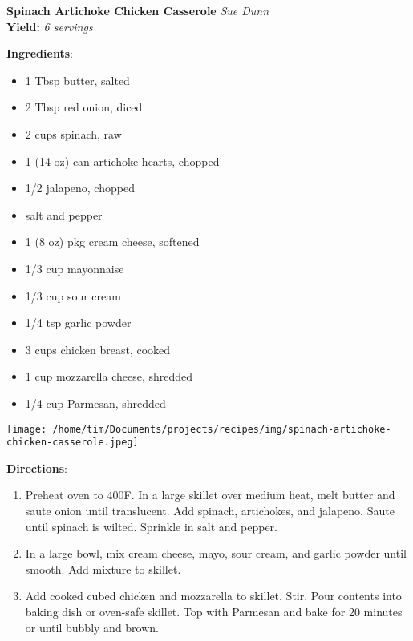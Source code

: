 \documentclass[11pt, twoside, openany]{book}
\begin{document}
\noindent\begin{minipage}[t]{\linewidth}%
{\Large\textbf{Spinach Artichoke Chicken Casserole}} \label{spinach-artichoke-chicken-casserole}\hfill\textit{Sue Dunn}\\
\textbf{Yield:} \textit{6 servings}\\
\noindent\begin{minipage}[t]{0.78\linewidth}%
\textbf{Ingredients}:\vspace{-3mm}
\begin{multicols}{2}
\begin{itemize}\setlength\itemsep{-1mm}
\item 1 Tbsp butter, salted
\item 2 Tbsp red onion, diced
\item 2 cups spinach, raw
\item 1 (14 oz) can artichoke hearts, chopped
\item 1/2 jalapeno, chopped
\item salt and pepper
\item 1 (8 oz) pkg cream cheese, softened
\item 1/3 cup mayonnaise
\item 1/3 cup sour cream
\item 1/4 tsp garlic powder
\item 3 cups chicken breast, cooked
\item 1 cup mozzarella cheese, shredded
\item 1/4 cup Parmesan, shredded
\end{itemize}
\end{multicols}
\end{minipage}
\noindent\begin{minipage}[t]{0.18\linewidth}
\centering \strut\vspace*{-\baselineskip}\newline
\texttt{[image: /home/tim/Documents/projects/recipes/img/spinach-artichoke-chicken-casserole.jpeg]}\\
\end{minipage}\vspace{3mm}
\textbf{Directions}:
\vspace{-3mm}\begin{enumerate}\setlength\itemsep{-1mm}
\item Preheat oven to 400F. In a large skillet over medium heat, melt butter and saute onion until translucent. Add spinach, artichokes, and jalapeno. Saute until spinach is wilted. Sprinkle in salt and pepper.
\item In a large bowl, mix cream cheese, mayo, sour cream, and garlic powder until smooth. Add mixture to skillet.
\item Add cooked cubed chicken and mozzarella to skillet. Stir. Pour contents into baking dish or oven-safe skillet. Top with Parmesan and bake for 20 minutes or until bubbly and brown.
\end{enumerate}
\end{minipage}\vspace{8mm}
\end{document}
